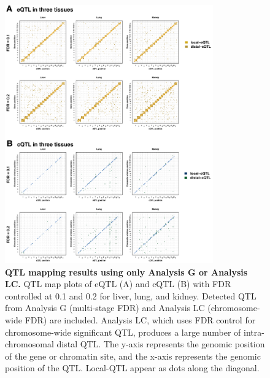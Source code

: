 \documentclass[9pt,twocolumn,twoside]{gsajnl}
\begin{document}
\begin{figure}[h]
\renewcommand{\familydefault}{\sfdefault}\normalfont
\centering
\includegraphics[width=0.8\textwidth, trim={0in 1.5in 0in 0in}, clip]{figs/qtl_map_supplemental.pdf}
\caption{\textbf{QTL mapping results using only Analysis G or Analysis LC.} QTL map plots of eQTL (A) and cQTL (B) with FDR controlled at 0.1 and 0.2 for liver, lung, and kidney. Detected QTL from Analysis G (multi-stage FDR) and Analysis LC (chromosome-wide FDR) are included. Analysis LC, which uses FDR control for chromosome-wide significant QTL, produces a large number of intra-chromosomal distal QTL. The y-axis represents the genomic position of the gene or chromatin site, and the x-axis represents the genomic position of the QTL. Local-QTL appear as dots along the diagonal.
\label{fig:grid_fdr_plot}}
\end{figure}
\end{document}
